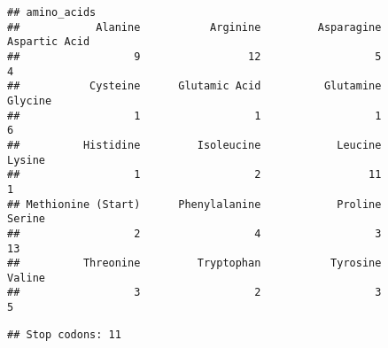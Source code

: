\documentclass[
]{article}
\newenvironment{Shaded}{\begin{snugshade}}{\end{snugshade}}
\newcommand{\AttributeTok}[1]{\textcolor[rgb]{0.13,0.29,0.53}{#1}}
\newcommand{\CommentTok}[1]{\textcolor[rgb]{0.56,0.35,0.01}{\textit{#1}}}
\newcommand{\DecValTok}[1]{\textcolor[rgb]{0.00,0.00,0.81}{#1}}
\newcommand{\FunctionTok}[1]{\textcolor[rgb]{0.13,0.29,0.53}{\textbf{#1}}}
\newcommand{\NormalTok}[1]{#1}
\newcommand{\OtherTok}[1]{\textcolor[rgb]{0.56,0.35,0.01}{#1}}
\newcommand{\SpecialCharTok}[1]{\textcolor[rgb]{0.81,0.36,0.00}{\textbf{#1}}}
\newcommand{\StringTok}[1]{\textcolor[rgb]{0.31,0.60,0.02}{#1}}
\begin{document}
\begin{Shaded}
\end{Shaded}

\begin{verbatim}
## amino_acids
##            Alanine           Arginine         Asparagine      Aspartic Acid 
##                  9                 12                  5                  4 
##           Cysteine      Glutamic Acid          Glutamine            Glycine 
##                  1                  1                  1                  6 
##          Histidine         Isoleucine            Leucine             Lysine 
##                  1                  2                 11                  1 
## Methionine (Start)      Phenylalanine            Proline             Serine 
##                  2                  4                  3                 13 
##          Threonine         Tryptophan           Tyrosine             Valine 
##                  3                  2                  3                  5
\end{verbatim}

\begin{Shaded}
\end{Shaded}

\begin{verbatim}
## Stop codons: 11
\end{verbatim}
\end{document}
